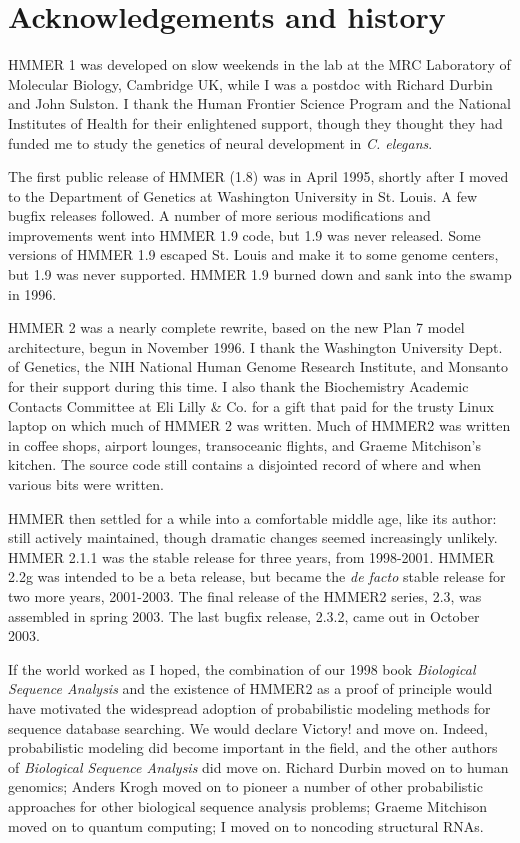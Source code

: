 \chapter{Acknowledgements and history}

HMMER 1 was developed on slow weekends in the lab at the MRC
Laboratory of Molecular Biology, Cambridge UK, while I was a postdoc
with Richard Durbin and John Sulston. I thank the Human Frontier
Science Program and the National Institutes of Health for their
enlightened support, though they thought they had funded me to study
the genetics of neural development in \emph{C. elegans}.

The first public release of HMMER (1.8) was in April 1995, shortly
after I moved to the Department of Genetics at Washington University
in St. Louis. A few bugfix releases followed. A number of more serious
modifications and improvements went into HMMER 1.9 code, but 1.9 was
never released. Some versions of HMMER 1.9 escaped St. Louis and make
it to some genome centers, but 1.9 was never supported. HMMER 1.9
burned down and sank into the swamp in 1996.

HMMER 2 was a nearly complete rewrite, based on the new Plan 7 model
architecture, begun in November 1996. I thank the Washington
University Dept. of Genetics, the NIH National Human Genome Research
Institute, and Monsanto for their support during this time.  I also
thank the Biochemistry Academic Contacts Committee at Eli Lilly \&
Co. for a gift that paid for the trusty Linux laptop on which much of
HMMER 2 was written. Much of HMMER2 was written in coffee shops,
airport lounges, transoceanic flights, and Graeme Mitchison's
kitchen. The source code still contains a disjointed record of where
and when various bits were written.

HMMER then settled for a while into a comfortable middle age, like its
author: still actively maintained, though dramatic changes seemed
increasingly unlikely. HMMER 2.1.1 was the stable release for three
years, from 1998-2001.  HMMER 2.2g was intended to be a beta release,
but became the \emph{de facto} stable release for two more years,
2001-2003. The final release of the HMMER2 series, 2.3, was assembled
in spring 2003.  The last bugfix release, 2.3.2, came out in October
2003.

If the world worked as I hoped, the combination of our 1998 book
\emph{Biological Sequence Analysis} and the existence of HMMER2 as a
proof of principle would have motivated the widespread adoption of
probabilistic modeling methods for sequence database searching. We
would declare Victory! and move on. Indeed, probabilistic modeling did
become important in the field, and the other authors of
\emph{Biological Sequence Analysis} did move on.  Richard Durbin moved
on to human genomics; Anders Krogh moved on to pioneer a number of
other probabilistic approaches for other biological sequence analysis
problems; Graeme Mitchison moved on to quantum computing; I moved on
to noncoding structural RNAs.


